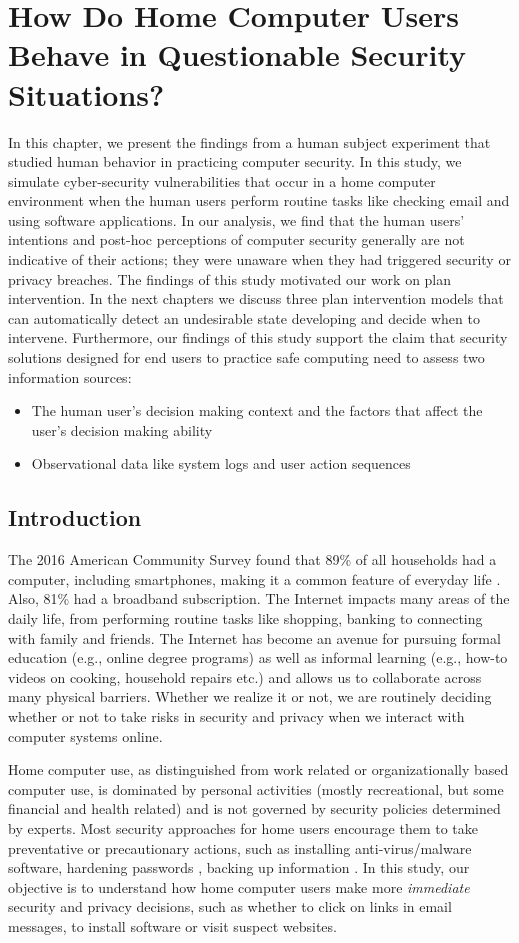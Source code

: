 \chapter{How Do Home Computer Users Behave in Questionable Security Situations?}
\label{chap:ch3}
In this chapter, we present the findings from a human subject experiment that studied human behavior in practicing computer security.
In this study, we simulate cyber-security vulnerabilities that occur in a home computer environment when the human users perform routine tasks like checking email and using software applications. 
In our analysis, we find that the human users' intentions and post-hoc perceptions of computer security generally are not indicative of their actions; they were unaware when they had triggered security or privacy breaches.
The findings of this study motivated our work on plan intervention. 
In the next chapters we discuss three plan intervention models that can automatically detect an undesirable state developing and decide when to intervene.
Furthermore, our findings of this study support the claim that security solutions designed for end users to practice safe computing need to assess two information sources: 
\begin{itemize}
\item The human user's decision making context and the factors that affect the user's decision making ability
\item Observational data like system logs and user action sequences
\end{itemize}

\section{Introduction}
The 2016 American Community Survey found that 89\% of all households had a computer, including smartphones, making it a common feature of everyday life \cite{ryan2016}. 
Also, 81\% had a broadband subscription. 
The Internet impacts many areas of the daily life, from performing routine tasks like shopping, banking to connecting with family and friends. 
The Internet has become an avenue for pursuing formal education (e.g., online degree programs) as well as informal learning (e.g., how-to videos on cooking, household repairs etc.) and allows us to collaborate across many physical barriers. 
Whether we realize it or not, we are routinely  deciding whether or not to take risks in security and privacy when we interact with computer systems online.

Home computer use, as distinguished from work related or organizationally based computer
use, is dominated by personal activities (mostly recreational, but some financial and health related) and is not governed by security policies determined by experts. 
Most security approaches for home users encourage them to take preventative or precautionary actions, such as installing anti-virus/malware software, hardening passwords \cite{chiasson2008}, backing up information \cite{dupuis2012}. 
In this study, our objective is to understand how home computer users
make more \textit{immediate} security and privacy decisions, such as whether to click on links in email messages, to install software or visit suspect websites. 

